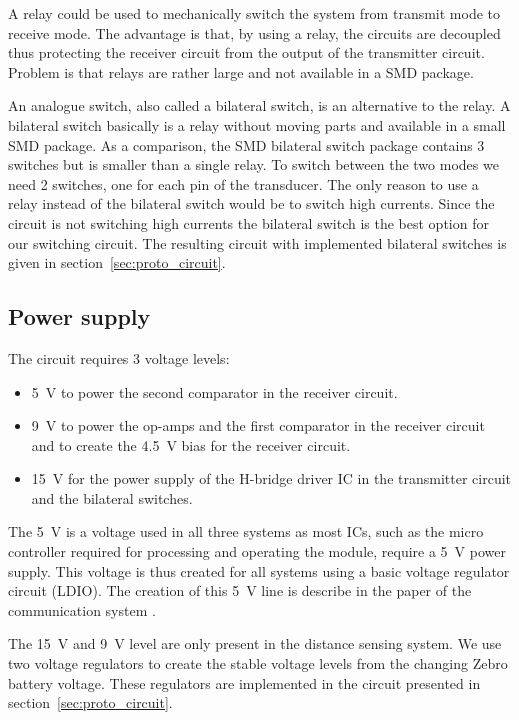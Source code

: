 A relay could be used to mechanically switch the system from transmit mode to receive mode.
The advantage is that, by using a relay, the circuits are decoupled thus protecting the receiver circuit from the output of the transmitter circuit.
Problem is that relays are rather large and not available in a SMD package.

An analogue switch, also called a bilateral switch, is an alternative to the relay.
A bilateral switch basically is a relay without moving parts and available in a small SMD package.
As a comparison, the SMD bilateral switch package contains 3 switches but is smaller than a single relay.
To switch between the two modes we need 2 switches, one for each pin of the transducer.
The only reason to use a relay instead of the bilateral switch would be to switch high currents.
Since the circuit is not switching high currents the bilateral switch is the best option for our switching circuit.
The resulting circuit with implemented bilateral switches is given in section~\ref{sec:proto_circuit}.

\subsection*{Power supply}

The circuit requires 3 voltage levels:
\begin{itemize}
\item
\SI{5}{\volt} to power the second comparator in the receiver circuit.
\item
\SI{9}{\volt} to power the op-amps and the first comparator in the receiver circuit and to create the \SI{4.5}{\volt} bias for the receiver circuit.
\item
\SI{15}{\volt} for the power supply of the H-bridge driver IC in the transmitter circuit and the bilateral switches.
\end{itemize}

The \SI{5}{\volt} is a voltage used in all three systems as most ICs, such as the micro controller required for processing and operating the module, require a \SI{5}{\volt} power supply.
This voltage is thus created for all systems using a basic voltage regulator circuit (LDIO).
The creation of this \SI{5}{\volt} line is describe in the paper of the communication system \cite{communication}.

The \SI{15}{\volt} and \SI{9}{\volt} level are only present in the distance sensing system.
We use two voltage regulators to create the stable voltage levels from the changing Zebro battery voltage. %
These regulators are implemented in the circuit presented in section~\ref{sec:proto_circuit}.

